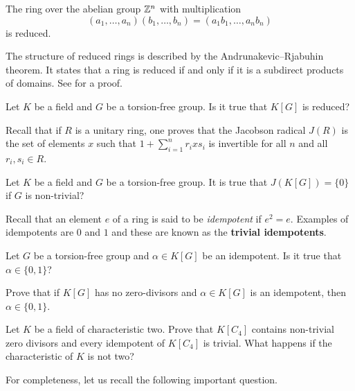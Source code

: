 \begin{example}
    The ring over the abelian group $\mathbb{Z}^n$ with multiplication  \[
    (a_1,\dots,a_n)(b_1,\dots,b_n)=(a_1b_1,\dots,a_nb_n)\]
    is reduced. 
\end{example}

The structure of 
reduced rings is described by the 
Andrunakevic--Rjabuhin theorem. It states
that a ring is reduced if and only if
it is a subdirect products of domains. See
\cite[3.20.5]{MR2015465} for a proof. 

\begin{question}
	\label{question:reduced}
	Let $K$ be a field and $G$ be a torsion-free group. Is it true that 
	$K[G]$ is reduced? 
\end{question}

Recall that if $R$ is a unitary ring, one proves that 
the Jacobson radical $J(R)$ is 
the set of elements $x$ such that
$1+\sum_{i=1}^n r_ixs_i$ is invertible 
for all $n$ and all $r_i,s_i\in R$.

\begin{question}
	\label{question:J}
	Let $K$ be a field and $G$ be a torsion-free group. It is true that 
	$J(K[G])=\{0\}$ if $G$ is non-trivial?
\end{question}

Recall that an element $e$ of a ring is said to be \emph{idempotent} 
if $e^2=e$. Examples of idempotents are $0$ and $1$ and 
these are known as the \textbf{trivial idempotents}. 

\begin{question}
	\label{question:idempotente}
	Let $G$ be a torsion-free group and $\alpha\in K[G]$ be an idempotent. 
	Is it true that $\alpha\in\{0,1\}$?
\end{question}

\begin{exercise}
	Prove that if $K[G]$ has no zero-divisors and $\alpha\in K[G]$ is an
	idempotent, then $\alpha\in\{0,1\}$.
\end{exercise}

\begin{exercise}
    Let $K$ be a field of characteristic two. 
	Prove that $K[C_4]$ contains non-trivial zero divisors and every
	idempotent of $K[C_4]$ is trivial. What happens if the characteristic of $K$ is not two?
\end{exercise}

For completeness, let us 
recall the following important question. 

